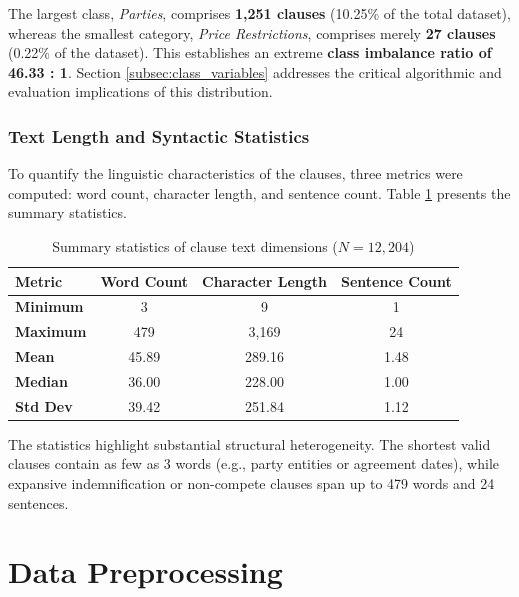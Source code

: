 The largest class, \textit{Parties}, comprises \textbf{1,251 clauses} (10.25\% of the total dataset), whereas the smallest category, \textit{Price Restrictions}, comprises merely \textbf{27 clauses} (0.22\% of the dataset). This establishes an extreme \textbf{class imbalance ratio of 46.33 : 1}. Section \ref{subsec:class_variables} addresses the critical algorithmic and evaluation implications of this distribution.

\subsubsection*{Text Length and Syntactic Statistics}
To quantify the linguistic characteristics of the clauses, three metrics were computed: word count, character length, and sentence count. Table \ref{tab:text_statistics} presents the summary statistics.

\begin{table}[h!]
\centering
\small
\begin{tabular}{lccc}
\toprule
\textbf{Metric} & \textbf{Word Count} & \textbf{Character Length} & \textbf{Sentence Count} \\
\midrule
\textbf{Minimum} & 3      & 9        & 1    \\
\textbf{Maximum} & 479    & 3,169    & 24   \\
\textbf{Mean}    & 45.89  & 289.16   & 1.48 \\
\textbf{Median}  & 36.00  & 228.00   & 1.00 \\
\textbf{Std Dev} & 39.42  & 251.84   & 1.12 \\
\bottomrule
\end{tabular}
\caption{Summary statistics of clause text dimensions ($N = 12,204$)}
\label{tab:text_statistics}
\end{table}

The statistics highlight substantial structural heterogeneity. The shortest valid clauses contain as few as 3 words (e.g., party entities or agreement dates), while expansive indemnification or non-compete clauses span up to 479 words and 24 sentences.

\section{Data Preprocessing}
\label{sec:data_preprocessing}

